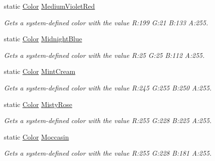\begin{DoxyCompactItemize}
static \hyperlink{struct_microsoft_1_1_xna_1_1_framework_1_1_color}{Color} \hyperlink{struct_microsoft_1_1_xna_1_1_framework_1_1_color_adef5faeceb9998e63de3b8e5558bcd06}{Medium\+Violet\+Red}
\begin{DoxyCompactList}\small\item\em Gets a system-\/defined color with the value R\+:199 G\+:21 B\+:133 A\+:255.\end{DoxyCompactList}\item 
static \hyperlink{struct_microsoft_1_1_xna_1_1_framework_1_1_color}{Color} \hyperlink{struct_microsoft_1_1_xna_1_1_framework_1_1_color_a85df7c344a8463a3d9fe4f3af7311ea3}{Midnight\+Blue}
\begin{DoxyCompactList}\small\item\em Gets a system-\/defined color with the value R\+:25 G\+:25 B\+:112 A\+:255.\end{DoxyCompactList}\item 
static \hyperlink{struct_microsoft_1_1_xna_1_1_framework_1_1_color}{Color} \hyperlink{struct_microsoft_1_1_xna_1_1_framework_1_1_color_a208d79d1e0cc39b86d0239a3b031040c}{Mint\+Cream}
\begin{DoxyCompactList}\small\item\em Gets a system-\/defined color with the value R\+:245 G\+:255 B\+:250 A\+:255.\end{DoxyCompactList}\item 
static \hyperlink{struct_microsoft_1_1_xna_1_1_framework_1_1_color}{Color} \hyperlink{struct_microsoft_1_1_xna_1_1_framework_1_1_color_acdd2c566d7cab34b61edf2df383dd4d5}{Misty\+Rose}
\begin{DoxyCompactList}\small\item\em Gets a system-\/defined color with the value R\+:255 G\+:228 B\+:225 A\+:255.\end{DoxyCompactList}\item 
static \hyperlink{struct_microsoft_1_1_xna_1_1_framework_1_1_color}{Color} \hyperlink{struct_microsoft_1_1_xna_1_1_framework_1_1_color_a53bfa0d59bc4d60dece8828dd4722d92}{Moccasin}
\begin{DoxyCompactList}\small\item\em Gets a system-\/defined color with the value R\+:255 G\+:228 B\+:181 A\+:255.\end{DoxyCompactList}\item 

\end{DoxyCompactItemize}

